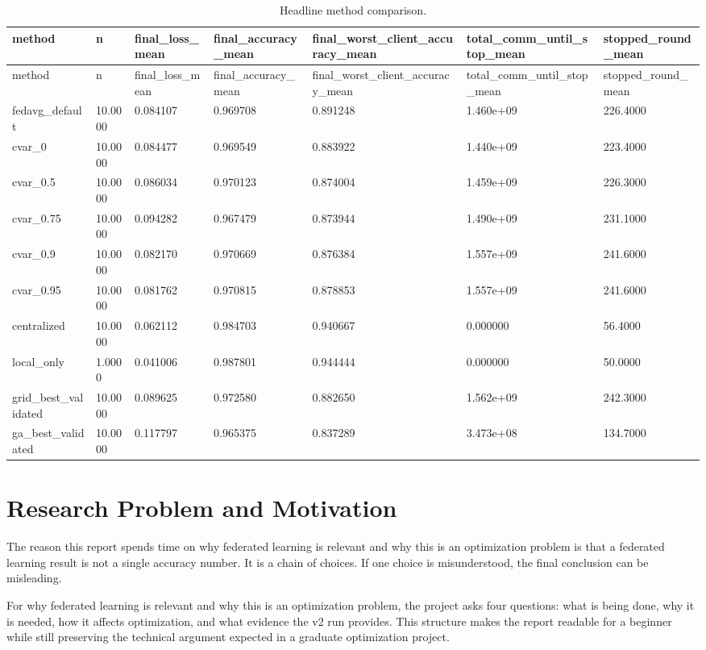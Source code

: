\documentclass[11pt]{report}
\begin{document}
\begin{longtable}{lllllll}
\caption{Headline method comparison.}\\
\toprule
method & n & final\_loss\_mean & final\_accuracy\_mean & final\_worst\_client\_accuracy\_mean & total\_comm\_until\_stop\_mean & stopped\_round\_mean \\
\midrule
\endfirsthead
\toprule
method & n & final\_loss\_mean & final\_accuracy\_mean & final\_worst\_client\_accuracy\_mean & total\_comm\_until\_stop\_mean & stopped\_round\_mean \\
\midrule
\endhead
fedavg\_default & 10.0000 & 0.084107 & 0.969708 & 0.891248 & 1.460e+09 & 226.4000 \\
cvar\_0 & 10.0000 & 0.084477 & 0.969549 & 0.883922 & 1.440e+09 & 223.4000 \\
cvar\_0.5 & 10.0000 & 0.086034 & 0.970123 & 0.874004 & 1.459e+09 & 226.3000 \\
cvar\_0.75 & 10.0000 & 0.094282 & 0.967479 & 0.873944 & 1.490e+09 & 231.1000 \\
cvar\_0.9 & 10.0000 & 0.082170 & 0.970669 & 0.876384 & 1.557e+09 & 241.6000 \\
cvar\_0.95 & 10.0000 & 0.081762 & 0.970815 & 0.878853 & 1.557e+09 & 241.6000 \\
centralized & 10.0000 & 0.062112 & 0.984703 & 0.940667 & 0.000000 & 56.4000 \\
local\_only & 1.0000 & 0.041006 & 0.987801 & 0.944444 & 0.000000 & 50.0000 \\
grid\_best\_validated & 10.0000 & 0.089625 & 0.972580 & 0.882650 & 1.562e+09 & 242.3000 \\
ga\_best\_validated & 10.0000 & 0.117797 & 0.965375 & 0.837289 & 3.473e+08 & 134.7000 \\
\bottomrule
\end{longtable}
\chapter{Research Problem and Motivation}
The reason this report spends time on why federated learning is relevant and why this is an
optimization problem is that a federated learning result is not a single accuracy number. It is a
chain of choices. If one choice is misunderstood, the final conclusion can be misleading.

For why federated learning is relevant and why this is an optimization problem, the project asks
four questions: what is being done, why it is needed, how it affects optimization, and what evidence
the v2 run provides. This structure makes the report readable for a beginner while still preserving
the technical argument expected in a graduate optimization project.
\end{document}
